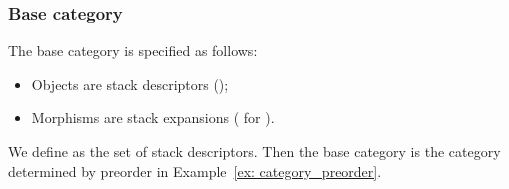 \documentclass[12pt,a4paper]{report}
\theoremstyle{definition}
\newcommand{\ang}[1]{\left\langle #1 \right\rangle}
\begin{document}
    \subsubsection{Base category}
    The base category \text{\Upsigma} is specified as follows:
    \begin{itemize}
        \item Objects are stack descriptors (\text{\textit{sd} = \ang{f, d}});
        \item Morphisms are stack expansions ( for ).
    \end{itemize}
    We define  as the set of stack descriptors. Then the base category is the category determined by preorder  in Example~\ref{ex: category_preorder}.
\end{document}
